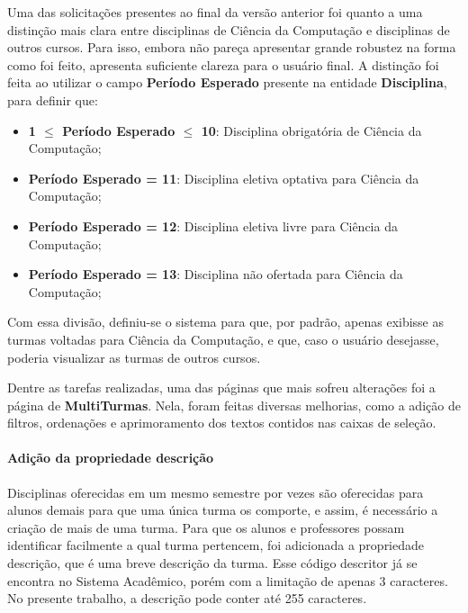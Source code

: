 Uma das solicitações presentes ao final da versão anterior foi quanto a uma distinção mais clara entre disciplinas de Ciência da Computação e disciplinas de outros cursos. Para isso, embora não pareça apresentar grande robustez na forma como foi feito, apresenta suficiente clareza para o usuário final. A distinção foi feita ao utilizar o campo \textbf{Período Esperado} presente na entidade \textbf{Disciplina}, para definir que:

\begin{itemize}
  \item \textbf{1 $\leq$ Período Esperado $\leq$ 10}: Disciplina obrigatória de Ciência da Computação;
  \item \textbf{Período Esperado = 11}: Disciplina eletiva optativa para Ciência da Computação;
  \item \textbf{Período Esperado = 12}: Disciplina eletiva livre para Ciência da Computação;
  \item \textbf{Período Esperado = 13}: Disciplina não ofertada para Ciência da Computação;
\end{itemize}

Com essa divisão, definiu-se o sistema para que, por padrão, apenas exibisse as turmas voltadas para Ciência da Computação, e que, caso o usuário desejasse, poderia visualizar as turmas de outros cursos.

 \label{ssssec:MultiTurmas}

Dentre as tarefas realizadas, uma das páginas que mais sofreu alterações foi a página de \textbf{MultiTurmas}. Nela, foram feitas diversas melhorias, como a adição de filtros, ordenações e aprimoramento dos textos contidos nas caixas de seleção.

\paragraph*{Adição da propriedade \textbf{descrição}}

Disciplinas oferecidas em um mesmo semestre por vezes são oferecidas para alunos demais para que uma única turma os comporte, e assim, é necessário a criação de mais de uma turma. Para que os alunos e professores possam identificar facilmente a qual turma pertencem, foi adicionada a propriedade descrição, que é uma breve descrição da turma. Esse código descritor já se encontra no Sistema Acadêmico, porém com a limitação de apenas 3 caracteres. No presente trabalho, a descrição pode conter até 255 caracteres.

